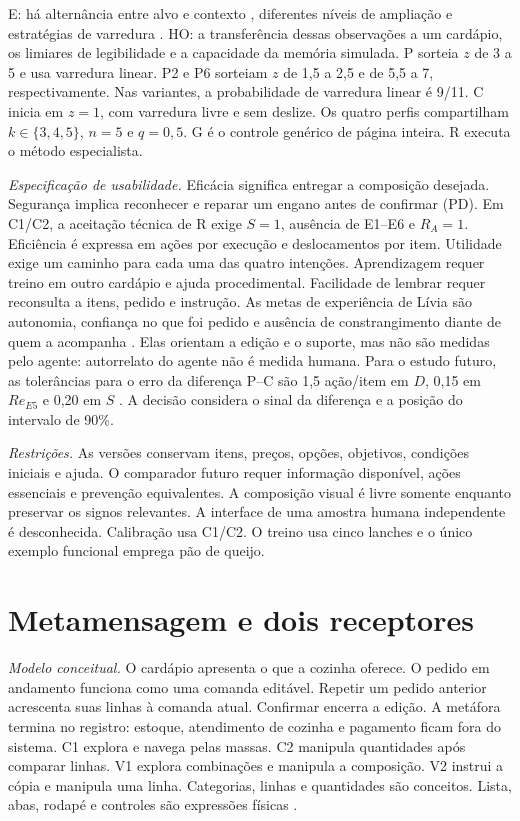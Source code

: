 \par E: há alternância entre alvo e contexto \cite[p.~9]{billah}, diferentes níveis de ampliação e estratégias de varredura \cite[pp.~12, 20, 25]{islam}. HO: a transferência dessas observações a um cardápio, os limiares de legibilidade e a capacidade da memória simulada. P sorteia $z$ de 3 a 5 e usa varredura linear. P2 e P6 sorteiam $z$ de 1,5 a 2,5 e de 5,5 a 7, respectivamente. Nas variantes, a probabilidade de varredura linear é 9/11. C inicia em $z=1$, com varredura livre e sem deslize. Os quatro perfis compartilham $k\in\{3,4,5\}$, $n=5$ e $q=0{,}5$. G é o controle genérico de página inteira. R executa o método especialista.
\par\textit{Especificação de usabilidade.} Eficácia significa entregar a composição desejada. Segurança implica reconhecer e reparar um engano antes de confirmar (PD). Em C1/C2, a aceitação técnica de R exige $S=1$, ausência de E1--E6 e $R_A=1$. Eficiência é expressa em ações por execução e deslocamentos por item. Utilidade exige um caminho para cada uma das quatro intenções. Aprendizagem requer treino em outro cardápio e ajuda procedimental. Facilidade de lembrar requer reconsulta a itens, pedido e instrução. As metas de experiência de Lívia são autonomia, confiança no que foi pedido e ausência de constrangimento diante de quem a acompanha \cite{preece}. Elas orientam a edição e o suporte, mas não são medidas pelo agente: autorrelato do agente não é medida humana. Para o estudo futuro, as tolerâncias para o erro da diferença P--C são 1,5 ação/item em $D$, 0,15 em $Re_{E5}$ e 0,20 em $S$ \cite[p.~7]{hts}. A decisão considera o sinal da diferença e a posição do intervalo de 90\%.
\par\textit{Restrições.} As versões conservam itens, preços, opções, objetivos, condições iniciais e ajuda. O comparador futuro requer informação disponível, ações essenciais e prevenção equivalentes. A composição visual é livre somente enquanto preservar os signos relevantes. A interface de uma amostra humana independente é desconhecida. Calibração usa C1/C2. O treino usa cinco lanches e o único exemplo funcional emprega pão de queijo.
\section{Metamensagem e dois receptores}

\textit{Modelo conceitual.} O cardápio apresenta o que a cozinha oferece. O pedido em andamento funciona como uma comanda editável. Repetir um pedido anterior acrescenta suas linhas à comanda atual. Confirmar encerra a edição. A metáfora termina no registro: estoque, atendimento de cozinha e pagamento ficam fora do sistema. C1 explora e navega pelas massas. C2 manipula quantidades após comparar linhas. V1 explora combinações e manipula a composição. V2 instrui a cópia e manipula uma linha. Categorias, linhas e quantidades são conceitos. Lista, abas, rodapé e controles são expressões físicas \cite[p.~199]{benyon}.
